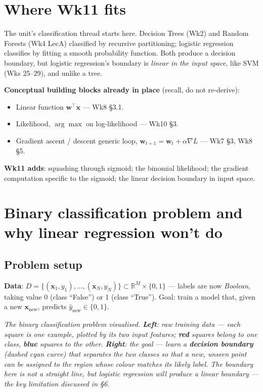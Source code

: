 \documentclass[11pt, a4paper]{article}
\begin{document}
\section{Where Wk11 fits}

The unit's classification thread starts here. Decision Trees (Wk2) and Random Forests (Wk4 LecA) classified by recursive partitioning; logistic regression classifies by fitting a smooth probability function. Both produce a decision boundary, but logistic regression's boundary is \emph{linear in the input space}, like SVM (Wks 25--29), and unlike a tree.

\textbf{Conceptual building blocks already in place} (recall, do not re-derive):
\begin{itemize}
  \item Linear function $\mathbf{w}^\top\mathbf{x}$ — Wk8 §3.1.
  \item Likelihood, $\arg\max$ on log-likelihood — Wk10 §3.
  \item Gradient ascent / descent generic loop, $\mathbf{w}_{t+1} = \mathbf{w}_t + \alpha\nabla L$ — Wk7 §3, Wk8 §5.
\end{itemize}

\textbf{Wk11 adds}: squashing through sigmoid; the binomial likelihood; the gradient computation specific to the sigmoid; the linear decision boundary in input space.

\section{Binary classification problem and why linear regression won't do}

\subsection{Problem setup}

\textbf{Data}: $D = \{(\mathbf{x}_1, y_1), \ldots, (\mathbf{x}_N, y_N)\} \subset \mathbb{R}^M\times\{0,1\}$ — labels are now \emph{Boolean}, taking value 0 (class ``False'') or 1 (class ``True''). Goal: train a model that, given a new $\mathbf{x}_{\text{new}}$, predicts $\hat y_{\text{new}}\in\{0,1\}$.

\begin{center}

\footnotesize\textit{The binary classification problem visualised. \textbf{Left}: raw training data --- each square is one example, plotted by its two input features; \textbf{red} squares belong to one class, \textbf{blue} squares to the other. \textbf{Right}: the goal --- learn a \textbf{decision boundary} (dashed cyan curve) that separates the two classes so that a new, unseen point can be assigned to the region whose colour matches its likely label. The boundary here is not a straight line, but logistic regression will produce a \emph{linear} boundary --- the key limitation discussed in \S6.}
\end{center}
\end{document}
